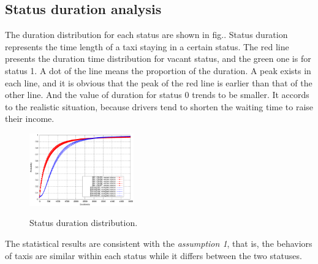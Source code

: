 \subsection{Status duration analysis}
  The duration distribution for each status are shown in fig.\label{figure_duration_for_each_status}. Status duration represents the time length of a taxi staying in a certain status. The red line presents the duration time distribution for vacant status, and the green one is for status 1. A dot of the line means the proportion of the duration. A peak exists in each line, and it is obvious that the peak of the red line is earlier than that of the other line. And the value of duration for status 0 trends to be smaller. It accords to the realistic situation, because drivers tend to shorten the waiting time to raise their income.
\begin{figure}
\centering
\includegraphics[width=0.4\textwidth]{figures_201103/assumption/durationdis.eps}\\
\caption{Status duration distribution.}\label{figure_duration_for_each_status}
\end{figure}

The statistical results are consistent with the \emph{assumption 1}, that is, the behaviors of taxis are similar within each status while it differs between the two statuses.
